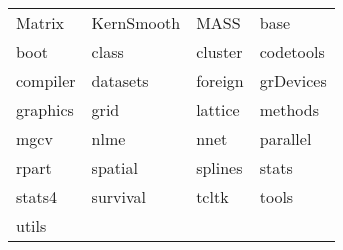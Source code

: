 \begin{tabular}{llll} 
Matrix & KernSmooth & MASS & base\\ 
boot & class & cluster & codetools\\ 
compiler & datasets & foreign & grDevices\\ 
graphics & grid & lattice & methods\\ 
mgcv & nlme & nnet & parallel\\ 
rpart & spatial & splines & stats\\ 
stats4 & survival & tcltk & tools\\ 
utils  &   &   \\ 
\end{tabular}
